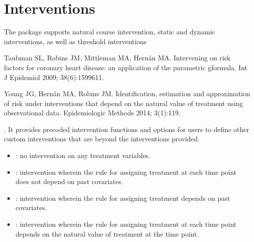 \documentclass[letterpaper,10pt,english]{sphinxmanual}
\begin{document}
\section{Interventions}
\label{\detokenize{Specifications/Interventions:interventions}}\label{\detokenize{Specifications/Interventions:id1}}\label{\detokenize{Specifications/Interventions::doc}}
\sphinxAtStartPar
The package supports natural course intervention, static and dynamic interventions, as well as
threshold interventions \sphinxstepexplicit %
\begin{footnote}[1]\label{\thesphinxscope.1}%
\sphinxAtStartFootnote
Taubman SL, Robins JM, Mittleman MA, Hernán MA. Intervening on risk factors for coronary heart disease: an
application of the parametric g\sphinxhyphen{}formula. Int J Epidemiol 2009; 38(6):1599\sphinxhyphen{}611.
%
\end{footnote} \sphinxstepexplicit %
\begin{footnote}[2]\label{\thesphinxscope.2}%
\sphinxAtStartFootnote
Young JG, Hernán MA, Robins JM. Identification, estimation and approximation of risk under interventions that
depend on the natural value of treatment using observational data. Epidemiologic Methods 2014; 3(1):1\sphinxhyphen{}19.
%
\end{footnote} . It provides pre\sphinxhyphen{}coded intervention functions and options for users
to define other custom interventions that are beyond the interventions
provided.
\begin{itemize}
\item {} 
\sphinxAtStartPar
{}: no intervention on any treatment variables.

\item {} 
\sphinxAtStartPar
{}:  intervention wherein the rule for assigning treatment at each time point does not depend on past covariates.

\item {} 
\sphinxAtStartPar
{}: intervention wherein the rule for assigning treatment depends on past covariates.

\item {} 
\sphinxAtStartPar
{}: intervention wherein the rule for assigning treatment at each time point depends on the natural value of treatment at the time point.

\end{itemize}
\end{document}
